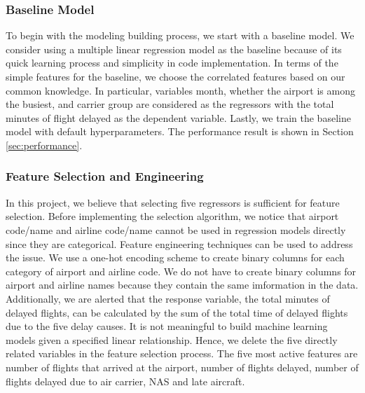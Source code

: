 \documentclass[11pt]{article}
\begin{document}
\subsubsection{Baseline Model}
To begin with the modeling building process, we start with a baseline model. We consider using a multiple linear regression model as the baseline because of its quick learning process and simplicity in code implementation. In terms of the simple features for the baseline, we choose the correlated features based on our common knowledge. In particular, variables month, whether the airport is among the busiest, and carrier group are considered as the regressors with the total minutes of flight delayed as the dependent variable. Lastly, we train the baseline model with  default hyperparameters. The performance result is shown in Section \ref{sec:performance}.

\subsubsection{Feature Selection and Engineering}
In this project, we believe that selecting five regressors is sufficient for feature selection. Before implementing the selection algorithm, we notice that airport code/name and airline code/name cannot be used in regression models directly since they are categorical. Feature engineering techniques can be used to address the issue. We use a one-hot encoding scheme to create binary columns for each category of airport and airline code. We do not have to create binary columns for airport and airline names because they contain the same imformation in the data. Additionally, we are alerted that the response variable, the total minutes of delayed flights, can be calculated by the sum of the total time of delayed flights due to the five delay causes. It is not meaningful to build machine learning models given a specified linear relationship. Hence, we delete the five directly related variables in the feature selection process. The five most active features are number of flights that arrived at the airport, number of flights delayed, number of flights delayed due to air carrier, NAS and late aircraft.
\end{document}
